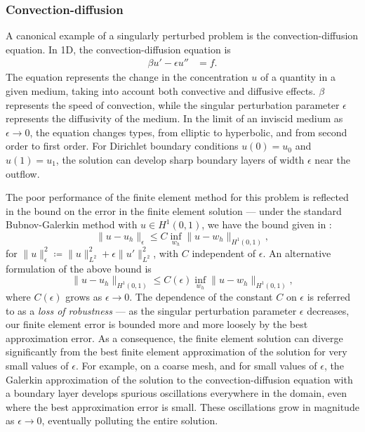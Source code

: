 \documentclass[11pt,onecolumn]{scrartcl}
\begin{document}
\subsubsection{Convection-diffusion}

A canonical example of a singularly perturbed problem is the convection-diffusion equation.  %
In 1D, the convection-diffusion equation is
\begin{align*}
\beta u'-\epsilon u'' &= f.
\end{align*}
The equation represents the change in the concentration $u$ of a quantity in a given medium, taking into account both convective and diffusive effects. $\beta$ represents the speed of convection, while the singular perturbation parameter $\epsilon$ represents the diffusivity of the medium. In the limit of an inviscid medium as $\epsilon\rightarrow 0$, the equation changes types, from elliptic to hyperbolic, and from second order to first order. For Dirichlet boundary conditions $u(0)=u_0$ and $u(1)= u_1$, the solution can develop sharp boundary layers of width $\epsilon$ near the outflow. 

The poor performance of the finite element method for this problem is reflected in the bound on the error in the finite element solution --- under the standard Bubnov-Galerkin method with $u\in H^1(0,1)$, we have the bound given in \cite{roos2008robust}:
\[
\|u-u_h\|_\epsilon \leq C \inf_{w_h}\|u-w_h\|_{H^1(0,1)},
\]
for $\|u\|_\epsilon^2 \coloneqq \|u\|_{L^2}^2 + \epsilon \|u'\|_{L^2}^2$, with $C$ independent of $\epsilon$. An alternative formulation of the above bound is 
\[
\|u-u_h\|_{H^1(0,1)} \leq C(\epsilon) \inf_{w_h}\|u-w_h\|_{H^1(0,1)},
\]
where $C(\epsilon)$ grows as $\epsilon\rightarrow 0$. The dependence of the constant $C$ on $\epsilon$ is referred to as a \textit{loss of robustness} --- as the singular perturbation parameter $\epsilon$ decreases, our finite element error is bounded more and more loosely by the best approximation error.  As a consequence, the finite element solution can diverge significantly from the best finite element approximation of the solution for very small values of $\epsilon$.  For example, on a coarse mesh, and for small values of $\epsilon$, the Galerkin approximation of the solution to the convection-diffusion equation with a boundary layer develops spurious oscillations everywhere in the domain, even where the best approximation error is small.  These oscillations grow in magnitude as $\epsilon \rightarrow 0$, eventually polluting the entire solution.  
\end{document}
